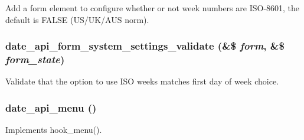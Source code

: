 Add a form element to configure whether or not week numbers are ISO-\/8601, the default is FALSE (US/UK/AUS norm). \hypertarget{date__api_8module_affcb2404b858829a6c6f2ac740541948}{
\subsubsection[{date\_\-api\_\-form\_\-system\_\-settings\_\-validate}]{\setlength{\rightskip}{0pt plus 5cm}date\_\-api\_\-form\_\-system\_\-settings\_\-validate (\&\$ {\em form}, \/  \&\$ {\em form\_\-state})}}
\label{date__api_8module_affcb2404b858829a6c6f2ac740541948}
Validate that the option to use ISO weeks matches first day of week choice. \hypertarget{date__api_8module_a13080af83552f547918ec86a9027ef62}{
\subsubsection[{date\_\-api\_\-menu}]{\setlength{\rightskip}{0pt plus 5cm}date\_\-api\_\-menu ()}}
\label{date__api_8module_a13080af83552f547918ec86a9027ef62}
Implements hook\_\-menu().

